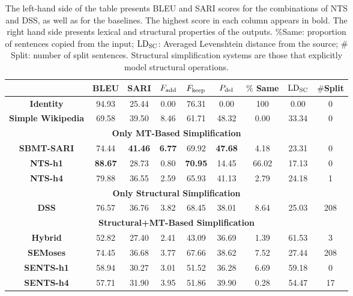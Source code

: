 \documentclass[11pt,a4paper]{article}
\begin{document}
\begin{center}
\begin{table*}[t]
\scriptsize
\centering
\begin{tabular}{|c|c|c|c|c|c||c|c|c|}
\hline
 & {\bf BLEU} & {\bf SARI} & {\bf $F_{\rm add}$} & {\bf $F_{\rm keep}$} & {\bf $P_{\rm del}$} & {\bf $\%$ Same} & ${\rm LD_{SC}}$ & $\#$Split\\
\hline\hline
{\bf Identity} &  94.93 &25.44 & 0.00 &  76.31 & 0.00 & 100 & 0.00 & 0\\
\hline
{\bf Simple Wikipedia} & 69.58  &  39.50  &  8.46 & 61.71 &  48.32 & 0.00 & 33.34 & 0\\
 \hline\hline
 \multicolumn{9}{|c|}{{\bf Only MT-Based Simplification}}\\
\hline
{\bf SBMT-SARI} & 74.44 & {\bf 41.46} & {\bf 6.77} & 69.92 & {\bf 47.68} & 4.18 & 23.31 & 0\\
\hline
{\bf NTS-h1} &  {\bf 88.67} & 28.73 & 0.80 & {\bf 70.95} & 14.45 & 66.02 & 17.13 & 0\\
\hline
{\bf NTS-h4}&79.88 & 36.55 & 2.59 & 65.93 &  41.13 &2.79 & 24.18 & 1\\
\hline\hline
\multicolumn{9}{|c|}{{\bf Only Structural Simplification}}\\
\hline 
{\bf DSS} &76.57 &  36.76 & 3.82 & 68.45 & 38.01 & 8.64 & 25.03 & 208\\
\hline\hline
\multicolumn{9}{|c|}{{\bf Structural+MT-Based Simplification}}\\
\hline
{\bf\sc Hybrid} & 52.82 & 27.40 & 2.41 & 43.09 & 36.69 & 1.39 & 61.53 & 3\\
\hline
{\bf SEMoses} &74.45  &36.68 & 3.77 & 67.66 & 38.62 & 7.52 & 27.44 & 208\\
\hline    
{\bf SENTS-h1} &  58.94 & 30.27 & 3.01 & 51.52 & 36.28 & 6.69 & 59.18 & 0\\
\hline
{\bf SENTS-h4}& 57.71 &  31.90 & 3.95 &  51.86 & 39.90 & 0.28 & 54.47 & 17\\
\hline   
\end{tabular}
\vspace{-0.1cm}
\hfill
\caption{The left-hand side of the table presents BLEU and SARI scores for the combinations of NTS and DSS, as well as for the baselines.
The highest score in each column appears in bold. The right hand side presents lexical and structural properties of the outputs.
$\%$Same: proportion of sentences copied from the input; ${\rm LD_{SC}}$: Averaged Levenshtein distance from the source; $\#$Split: number of split sentences.
Structural simplification systems are those that explicitly model structural operations.}
\label{automatic_evaluation}
\end{table*}
\end{center}
\end{document}
